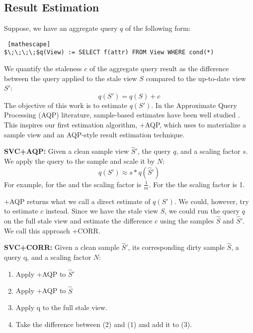 \subsection{Result Estimation}
Suppose, we have an aggregate query $q$ of the following form:
\begin{lstlisting} [mathescape]
$\;\;\;\;$q(View) := SELECT f(attr) FROM View WHERE cond(*)
\end{lstlisting}
We quantify the staleness $c$ of the aggregate query result as the difference
between the query applied to the stale view $S$ compared to the up-to-date view $S'$:
\[
q(S') = q(S) + c
\]
The objective of this work is to estimate $q(S')$.
In the Approximate Query Processing (AQP) literature, sample-based estimates have been well studied \cite{OlkenR86, AgarwalMPMMS13}.
This inspires our first estimation algorithm, \svcnospace+AQP, which uses \svc to materialize a sample view and an AQP-style
result estimation technique.

\vspace{0.25em}

\noindent\textbf{SVC+AQP: }  Given a clean sample view $\widehat{S}'$, the query $q$, and a scaling factor $s$.
We apply the query to the sample and scale it by $N$:
\[
q(S') \approx s*q(\widehat{S}')
\]
For example, for the \sumfunc and \countfunc the scaling factor is $\frac{1}{m}$. For the \avgfunc the scaling factor is 1.

\svcnospace+AQP returns what we call a direct estimate of $q(S')$.
We could, however, try to estimate $c$ instead.
Since we have the stale view $S$, we could run the query $q$ on the full stale view and 
estimate the difference $c$ using the samples $\widehat{S}$ and $\widehat{S}'$.
We call this approach \svcnospace+CORR.

\vspace{0.25em}

\noindent\textbf{SVC+CORR: } Given a clean sample $\widehat{S}'$, its corresponding dirty sample $\widehat{S}$, a query q, and a scaling factor $N$:
\begin{enumerate}[noitemsep]
\item Apply \svcnospace+AQP to $\widehat{S}'$
\item Apply \svcnospace+AQP to $\widehat{S}$
\item Apply q to the full stale view.
\item Take the difference between (2) and (1) and add it to (3).
\end{enumerate}


